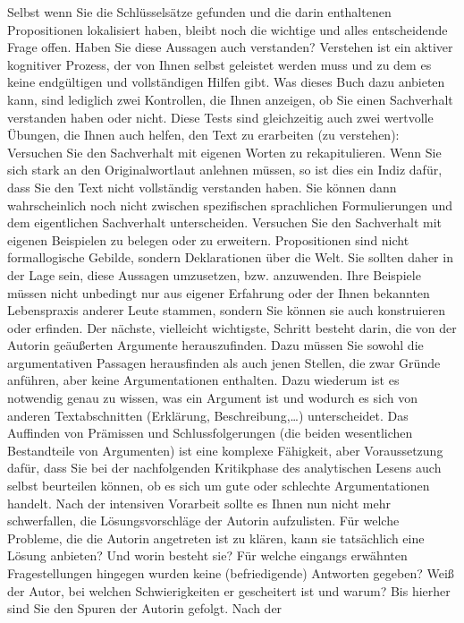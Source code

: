 \documentclass[]{book}
\theoremstyle{definition}
\theoremstyle{definition}
\theoremstyle{definition}
\theoremstyle{remark}
\begin{document}
Selbst wenn Sie die Schlüsselsätze gefunden und die darin enthaltenen
Propositionen lokalisiert haben, bleibt noch die wichtige und alles
entscheidende Frage offen. Haben Sie diese Aussagen auch verstanden?
Verstehen ist ein aktiver kognitiver Prozess, der von Ihnen selbst
geleistet werden muss und zu dem es keine endgültigen und vollständigen
Hilfen gibt. Was dieses Buch dazu anbieten kann, sind lediglich zwei
Kontrollen, die Ihnen anzeigen, ob Sie einen Sachverhalt verstanden
haben oder nicht. Diese Tests sind gleichzeitig auch zwei wertvolle
Übungen, die Ihnen auch helfen, den Text zu erarbeiten (zu verstehen):
Versuchen Sie den Sachverhalt mit eigenen Worten zu rekapitulieren. Wenn
Sie sich stark an den Originalwortlaut anlehnen müssen, so ist dies ein
Indiz dafür, dass Sie den Text nicht vollständig verstanden haben. Sie
können dann wahrscheinlich noch nicht zwischen spezifischen sprachlichen
Formulierungen und dem eigentlichen Sachverhalt unterscheiden. Versuchen
Sie den Sachverhalt mit eigenen Beispielen zu belegen oder zu erweitern.
Propositionen sind nicht formallogische Gebilde, sondern Deklarationen
über die Welt. Sie sollten daher in der Lage sein, diese Aussagen
umzusetzen, bzw. anzuwenden. Ihre Beispiele müssen nicht unbedingt nur
aus eigener Erfahrung oder der Ihnen bekannten Lebenspraxis anderer
Leute stammen, sondern Sie können sie auch konstruieren oder erfinden.
Der nächste, vielleicht wichtigste, Schritt besteht darin, die von der
Autorin geäußerten Argumente herauszufinden. Dazu müssen Sie sowohl die
argumentativen Passagen herausfinden als auch jenen Stellen, die zwar
Gründe anführen, aber keine Argumentationen enthalten. Dazu wiederum ist
es notwendig genau zu wissen, was ein Argument ist und wodurch es sich
von anderen Textabschnitten (Erklärung, Beschreibung,\ldots{})
unterscheidet. Das Auffinden von Prämissen und Schlussfolgerungen (die
beiden wesentlichen Bestandteile von Argumenten) ist eine komplexe
Fähigkeit, aber Voraussetzung dafür, dass Sie bei der nachfolgenden
Kritikphase des analytischen Lesens auch selbst beurteilen können, ob es
sich um gute oder schlechte Argumentationen handelt. Nach der intensiven
Vorarbeit sollte es Ihnen nun nicht mehr schwerfallen, die
Lösungsvorschläge der Autorin aufzulisten. Für welche Probleme, die die
Autorin angetreten ist zu klären, kann sie tatsächlich eine Lösung
anbieten? Und worin besteht sie? Für welche eingangs erwähnten
Fragestellungen hingegen wurden keine (befriedigende) Antworten gegeben?
Weiß der Autor, bei welchen Schwierigkeiten er gescheitert ist und
warum? Bis hierher sind Sie den Spuren der Autorin gefolgt. Nach der
\end{document}
